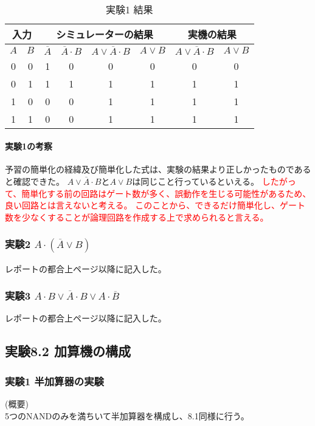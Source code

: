 \documentclass[dvipdfmx]{jsarticle}
\newcommand{\Add}[1]{\textcolor{red}{#1}}
\begin{document}
\begin{table}[hbtp]
  \caption{実験1 結果}
  \centering
  \begin{tabular}{|c|c||c|c|c|c||c|c|} \hline
    \multicolumn{2}{|c||}{入力} & \multicolumn{4}{c||}{シミュレーターの結果} & \multicolumn{2}{c|}{実機の結果 }\\ \hline
    $A$ & $B$ & $\overline{A}$ & $\overline{A} \cdot B$ & $A \vee \overline{A} \cdot B$ & $A \vee B$ & $A \vee \overline{A} \cdot B$ & $A \vee B$ \\ \hline
    0 & 0 & 1 & 0 & 0 & 0 & 0 & 0 \\ \hline
    0 & 1 & 1 & 1 & 1 & 1 & 1 & 1 \\ \hline
    1 & 0 & 0 & 0 & 1 & 1 & 1 & 1 \\ \hline
    1 & 1 & 0 & 0 & 1 & 1 & 1 & 1 \\ \hline
  \end{tabular}
  \label{tb:4-2}
\end{table}

\paragraph{実験1の考察}

予習の簡単化の経緯及び簡単化した式は、実験の結果より正しかったものであると確認できた。
$A \vee \overline{A} \cdot B$と$A \vee B$は同じこと行っているといえる。
\Add{したがって、簡単化する前の回路はゲート数が多く、誤動作を生じる可能性があるため、良い回路とは言えないと考える。
このことから、できるだけ簡単化し、ゲート数を少なくすることが論理回路を作成する上で求められると言える。}

\subsubsection{実験2 $A \cdot (\overline{A} \vee B)$}
レポートの都合上ページ\pageref*{Aiu}以降に記入した。

\subsubsection{実験3 $A \cdot B \vee \overline{A} \cdot B \vee A \cdot \overline{B}$}
レポートの都合上ページ\pageref*{Aiu}以降に記入した。

\subsection{実験8.2 加算機の構成}

\subsubsection{実験1 半加算器の実験}
(概要)\\
5つのNANDのみを満ちいて半加算器を構成し、8.1同様に行う。
\end{document}
